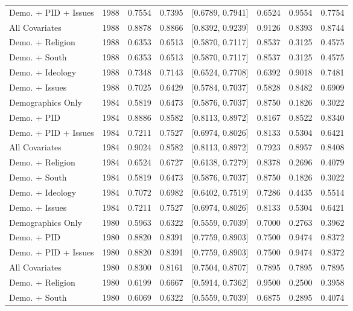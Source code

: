 \begin{longtable}{lrrrlrrr}
  Demo. + PID + Issues & 1988 & 0.7554 & 0.7395 & [0.6789, 0.7941] & 0.6524 & 0.9554 & 0.7754 \\ 
  All Covariates & 1988 & 0.8878 & 0.8866 & [0.8392, 0.9239] & 0.9126 & 0.8393 & 0.8744 \\ 
  Demo. + Religion & 1988 & 0.6353 & 0.6513 & [0.5870, 0.7117] & 0.8537 & 0.3125 & 0.4575 \\ 
  Demo. + South & 1988 & 0.6353 & 0.6513 & [0.5870, 0.7117] & 0.8537 & 0.3125 & 0.4575 \\ 
  Demo. + Ideology & 1988 & 0.7348 & 0.7143 & [0.6524, 0.7708] & 0.6392 & 0.9018 & 0.7481 \\ 
  Demo. + Issues & 1988 & 0.7025 & 0.6429 & [0.5784, 0.7037] & 0.5828 & 0.8482 & 0.6909 \\ 
  Demographics Only & 1984 & 0.5819 & 0.6473 & [0.5876, 0.7037] & 0.8750 & 0.1826 & 0.3022 \\ 
  Demo. + PID & 1984 & 0.8886 & 0.8582 & [0.8113, 0.8972] & 0.8167 & 0.8522 & 0.8340 \\ 
  Demo. + PID + Issues & 1984 & 0.7211 & 0.7527 & [0.6974, 0.8026] & 0.8133 & 0.5304 & 0.6421 \\ 
  All Covariates & 1984 & 0.9024 & 0.8582 & [0.8113, 0.8972] & 0.7923 & 0.8957 & 0.8408 \\ 
  Demo. + Religion & 1984 & 0.6524 & 0.6727 & [0.6138, 0.7279] & 0.8378 & 0.2696 & 0.4079 \\ 
  Demo. + South & 1984 & 0.5819 & 0.6473 & [0.5876, 0.7037] & 0.8750 & 0.1826 & 0.3022 \\ 
  Demo. + Ideology & 1984 & 0.7072 & 0.6982 & [0.6402, 0.7519] & 0.7286 & 0.4435 & 0.5514 \\ 
  Demo. + Issues & 1984 & 0.7211 & 0.7527 & [0.6974, 0.8026] & 0.8133 & 0.5304 & 0.6421 \\ 
  Demographics Only & 1980 & 0.5963 & 0.6322 & [0.5559, 0.7039] & 0.7000 & 0.2763 & 0.3962 \\ 
  Demo. + PID & 1980 & 0.8820 & 0.8391 & [0.7759, 0.8903] & 0.7500 & 0.9474 & 0.8372 \\ 
  Demo. + PID + Issues & 1980 & 0.8820 & 0.8391 & [0.7759, 0.8903] & 0.7500 & 0.9474 & 0.8372 \\ 
  All Covariates & 1980 & 0.8300 & 0.8161 & [0.7504, 0.8707] & 0.7895 & 0.7895 & 0.7895 \\ 
  Demo. + Religion & 1980 & 0.6199 & 0.6667 & [0.5914, 0.7362] & 0.9500 & 0.2500 & 0.3958 \\ 
  Demo. + South & 1980 & 0.6069 & 0.6322 & [0.5559, 0.7039] & 0.6875 & 0.2895 & 0.4074 \\ 

\end{longtable}

